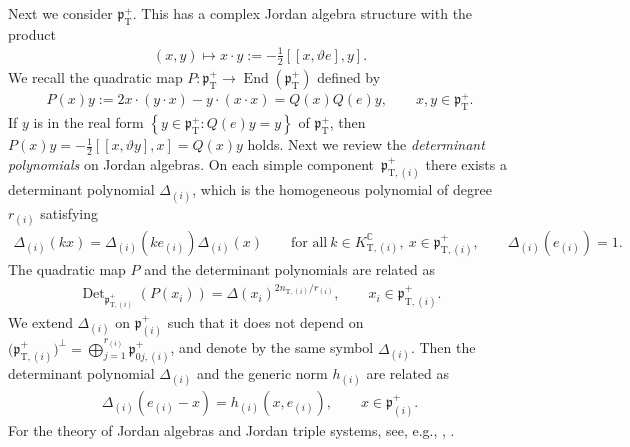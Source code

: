 \documentclass[pdftex]{sigma}
\numberwithin{equation}{section}
\newcommand{\BC}{\mathbb{C}}
\newcommand{\fp}{\mathfrak{p}}
\newcommand{\rT}{\mathrm{T}}
\newcommand{\End}{\operatorname{End}}
\newcommand{\Det}{\operatorname{Det}}
\begin{document}
Next we consider $\fp^+_\rT$. This has a complex Jordan algebra structure with the product
\begin{gather*} (x,y)\mapsto x\cdot y:=-\tfrac{1}{2}[[x,\vartheta e],y]. \end{gather*}
We recall the quadratic map $P\colon \fp^+_\rT\to\End(\fp^+_\rT)$ defined by
\begin{gather}\label{quad_repn}
P(x)y:=2x\cdot(y\cdot x)-y\cdot(x\cdot x)=Q(x)Q(e)y, \qquad x,y\in\fp^+_\rT .
\end{gather}
If $y$ is in the real form $\left\{y\in\fp^+_\rT\colon Q(e)y=y\right\}$ of $\fp^+_\rT$,
then $P(x)y=-\frac{1}{2}[[x,\vartheta y],x]=Q(x)y$ holds.
Next we review the \textit{determinant polynomials} on Jordan algebras.
On each simple component~$\fp^+_{\rT,(i)}$ there exists a determinant polynomial $\Delta_{(i)}$,
which is the homogeneous polynomial of degree~$r_{(i)}$ satisfying
\begin{gather*}
\Delta_{(i)}(kx)=\Delta_{(i)}(ke_{(i)})\Delta_{(i)}(x)
\qquad \text{for all} \ k\in K^\BC_{\rT,(i)},\ x\in \fp^+_{\rT,(i)},\qquad
\Delta_{(i)}(e_{(i)})=1.
\end{gather*}
The quadratic map $P$ and the determinant polynomials are related as
\begin{gather*} \Det_{\fp^+_{\rT,(i)}}(P(x_i))=\Delta(x_i)^{2n_{\rT,(i)}/r_{(i)}}, \qquad x_i\in\fp^+_{\rT,(i)} . \end{gather*}
We  extend $\Delta_{(i)}$ on $\fp^+_{(i)}$ such that it does not depend on $\big(\fp^+_{\rT,(i)}\big)^\bot=\bigoplus\limits_{j=1}^{r_{(i)}} \fp^+_{0j,(i)}$, and denote by the same symbol $\Delta_{(i)}$.
Then the determinant polynomial $\Delta_{(i)}$ and the generic norm $h_{(i)}$ are related as
\begin{gather}\label{det_norm}
\Delta_{(i)}(e_{(i)}-x)=h_{(i)}(x,e_{(i)}), \qquad x\in\fp^+_{(i)}.
\end{gather}
For the theory of Jordan algebras and Jordan triple systems, see, e.g., \cite[Part V]{FKKLR}, \cite{FK, L,Sat}.
\end{document}

